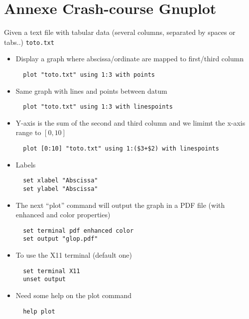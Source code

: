 \documentclass[a4paper, 11pt, french]{article}
\begin{document}
\newpage
\section*{\bf Annexe \rm Crash-course Gnuplot}

Given a text file with tabular data (several columns, separated by spaces or tabs..) \texttt{toto.txt}
\begin{itemize}
\item Display a graph where abscissa/ordinate  are mapped to first/third column  
\begin{verbatim}
  plot "toto.txt" using 1:3 with points
\end{verbatim}

\item Same graph with lines and points between datum
\begin{verbatim}
  plot "toto.txt" using 1:3 with linespoints
\end{verbatim}
\item Y-axis is the sum of the second and third column and we limimt
  the x-axis range to $[0,10]$
\begin{verbatim}
  plot [0:10] "toto.txt" using 1:($3+$2) with linespoints
\end{verbatim}
\item Labels
\begin{verbatim}
  set xlabel "Abscissa"
  set ylabel "Abscissa"
\end{verbatim}
\item The next ``plot'' command will output the graph in a PDF file
  (with enhanced and color properties)
\begin{verbatim}
  set terminal pdf enhanced color
  set output "glop.pdf"
\end{verbatim}
\item To use the X11 terminal (default one)
\begin{verbatim}
  set terminal X11
  unset output
\end{verbatim}
\item Need some help on the plot command
\begin{verbatim}
  help plot
\end{verbatim}

\end{itemize}
\end{document}
